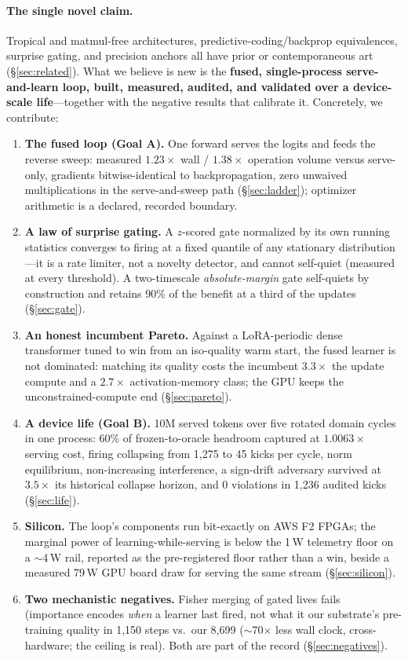 \documentclass{article}
\begin{document}
\paragraph{The single novel claim.}
Tropical and matmul-free architectures, predictive-coding/backprop
equivalences, surprise gating, and precision anchors all have prior or
contemporaneous art (\S\ref{sec:related}). What we believe is new is the
\textbf{fused, single-process serve-and-learn loop, built, measured, audited,
and validated over a device-scale life}---together with the negative results
that calibrate it. Concretely, we contribute:
\begin{enumerate}
\item \textbf{The fused loop (Goal A).} One forward serves the logits and
feeds the reverse sweep: measured $1.23\times$ wall / $1.38\times$ operation
volume versus serve-only, gradients bitwise-identical to backpropagation,
zero unwaived multiplications in the serve-and-sweep path
(\S\ref{sec:ladder}); optimizer arithmetic is a declared, recorded boundary.
\item \textbf{A law of surprise gating.} A $z$-scored gate normalized by its
own running statistics converges to firing at a fixed quantile of any
stationary distribution---it is a rate limiter, not a novelty detector, and
cannot self-quiet (measured at every threshold). A two-timescale
\emph{absolute-margin} gate self-quiets by construction and retains 90\% of
the benefit at a third of the updates (\S\ref{sec:gate}).
\item \textbf{An honest incumbent Pareto.} Against a LoRA-periodic dense
transformer tuned to win from an iso-quality warm start, the fused learner is
not dominated: matching its quality costs the incumbent $3.3\times$ the
update compute and a $2.7\times$ activation-memory class; the GPU keeps the
unconstrained-compute end (\S\ref{sec:pareto}).
\item \textbf{A device life (Goal B).} 10M served tokens over five rotated
domain cycles in one process: 60\% of frozen-to-oracle headroom captured at
$1.0063\times$ serving cost, firing collapsing from 1{,}275 to 45 kicks per
cycle, norm equilibrium, non-increasing interference, a sign-drift adversary
survived at $3.5\times$ its historical collapse horizon, and 0 violations in
1{,}236 audited kicks (\S\ref{sec:life}).
\item \textbf{Silicon.} The loop's components run bit-exactly on AWS F2
FPGAs; the marginal power of learning-while-serving is below the 1\,W
telemetry floor on a $\sim$4\,W rail, reported as the pre-registered floor
rather than a win, beside a measured 79\,W GPU board draw for serving the
same stream (\S\ref{sec:silicon}).
\item \textbf{Two mechanistic negatives.} Fisher merging of gated lives
fails (importance encodes \emph{when} a learner last fired, not what it
our substrate's pre-training quality in 1{,}150 steps vs.\ our 8{,}699
($\sim$70$\times$ less wall clock, cross-hardware; the ceiling is real). Both are part of
the record (\S\ref{sec:negatives}).
\end{enumerate}
\end{document}
